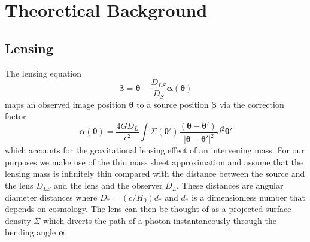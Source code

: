 \documentclass[onecolumn,galley]{mn2e}
\renewcommand{\vec}[1]{\ensuremath{\boldsymbol{#1}}}
\begin{document}



\section{Theoretical Background}

\subsection{Lensing}

The lensing equation
%
\begin{equation}
\vec\beta = \vec\theta - \frac{D_{LS}}{D_S}\vec\alpha(\vec\theta)
\label{lensing equation}
\end{equation}
%
maps an observed image position $\vec\theta$ to a source position $\vec\beta$
via the correction factor 
%
\begin{equation}
\vec\alpha(\vec\theta) = \frac{4GD_L}{c^2} \int \Sigma(\vec\theta')\frac{(\vec\theta - \vec\theta')}{\ |\vec\theta - \vec\theta'|^2}d^2\vec\theta'
\end{equation}
%
which accounts for the gravitational lensing effect of an intervening mass. For
our purposes we make use of the thin mass sheet approximation and assume that
the lensing mass is infinitely thin compared with the distance between the
source and the lens $D_{LS}$ and the lens and the observer $D_{L}$. These
distances are angular diameter distances where $D_* = (c/H_0)d_*$ and $d_*$ is
a dimensionless number that depends on cosmology.  The lens can then be thought
of as a projected surface density $\Sigma$ which diverts the path of a photon
instantaneously through the bending angle $\vec\alpha$.
\end{document}
